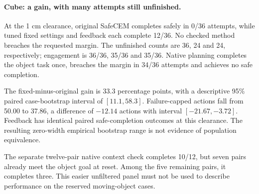 \paragraph{Cube: a gain, with many attempts still unfinished.}
At the 1 cm clearance, original SafeCEM completes safely in 0/36 attempts,
while tuned fixed settings and feedback each complete 12/36. No checked
method breaches the requested margin. The unfinished counts are 36, 24
and 24, respectively; engagement is 36/36, 35/36 and 35/36. Native planning
completes the object task once, breaches the margin in 34/36 attempts and
achieves no safe completion.

The fixed-minus-original gain is 33.3 percentage points, with a descriptive
95\% paired case-bootstrap interval of $[11.1,58.3]$. Failure-capped actions
fall from 50.00 to 37.86, a difference of $-12.14$ actions with interval
$[-21.67,-3.72]$. Feedback has identical paired safe-completion outcomes at
this clearance. The resulting zero-width empirical bootstrap range is not
evidence of population equivalence.

The separate twelve-pair native context check completes 10/12, but seven
pairs already meet the object goal at reset. Among the five remaining
pairs, it completes three. This easier unfiltered panel must not be used
to describe performance on the reserved moving-object cases.
